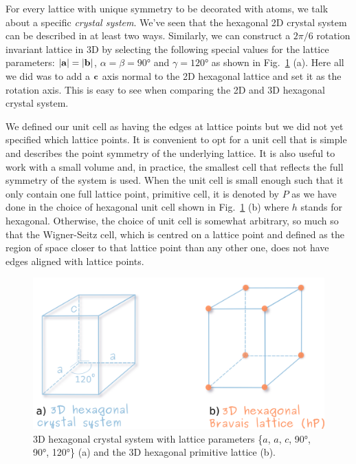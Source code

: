 For every lattice with unique symmetry to be decorated with atoms, we talk about a specific \textit{crystal system}. We've seen that the hexagonal 2D crystal system can be described in at least two ways. Similarly, we can construct a $2\pi/6$ rotation invariant lattice in 3D by selecting the following special values for the lattice parameters:  $|\vb{a}|=|\vb{b}|$, $\alpha = \beta = 90\si{\degree}$ and $\gamma=120\si{\degree}$ as shown in Fig.~\ref{Fig:hex3lattice} (a). Here all we did was to add a $\vb{c}$ axis normal to the 2D hexagonal lattice and set it as the rotation axis. This is easy to see when comparing the 2D and 3D hexagonal crystal system.
 
We defined our unit cell as having the edges at lattice points but we did not yet specified which lattice points. It is convenient to opt for a unit cell that is simple and describes the point symmetry of the underlying lattice. It is also useful to work with a small volume and, in practice, the smallest cell that reflects the full symmetry of the system is used. When the unit cell is small enough such that it only contain one full lattice point, \ie primitive cell, it is denoted by $P$ as we have done in the choice of hexagonal unit cell shown in Fig.~\ref{Fig:hex3lattice} (b) where $h$ stands for hexagonal. Otherwise, the choice of unit cell is somewhat arbitrary, so much so that the Wigner-Seitz cell, which is centred on a lattice point and defined as the region of space closer to that lattice point than any other one, does not have edges aligned with lattice points. 


 
\begin{figure}[htb]
\centering
\includegraphics[width=0.7\linewidth]{Figures/hex3Dlattice.png}
\caption[3D hexagonal crystal system.]{3D hexagonal crystal system  with lattice parameters \{$a$, $a$, $c$, 90\si{\degree}, 90\si{\degree}, 120\si{\degree}\} (a) and the 3D hexagonal primitive lattice (b).  }
\label{Fig:hex3lattice}
\end{figure}



